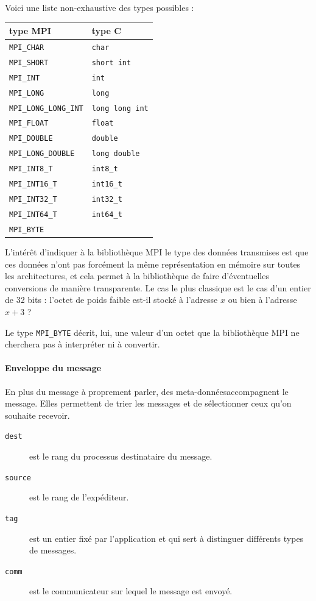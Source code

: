 Voici une liste non-exhaustive des types possibles :
\begin{center}
\begin{tabular}{|l|l|}
\hline
  type MPI & type C \\
\hline
\hline
\texttt{MPI\_CHAR} & \texttt{char} \\
\hline
\texttt{MPI\_SHORT} & \texttt{short int} \\
\hline
\texttt{MPI\_INT} & \texttt{int} \\
\hline
\texttt{MPI\_LONG} & \texttt{long} \\
\hline
\texttt{MPI\_LONG\_LONG\_INT} & \texttt{long long int} \\
\hline
\texttt{MPI\_FLOAT} & \texttt{float} \\
\hline
\texttt{MPI\_DOUBLE} & \texttt{double} \\
\hline
\texttt{MPI\_LONG\_DOUBLE} & \texttt{long double} \\
\hline
\texttt{MPI\_INT8\_T} & \texttt{int8\_t} \\
\hline
\texttt{MPI\_INT16\_T} & \texttt{int16\_t} \\
\hline
\texttt{MPI\_INT32\_T} & \texttt{int32\_t} \\
\hline
\texttt{MPI\_INT64\_T} & \texttt{int64\_t} \\
\hline
\texttt{MPI\_BYTE} & \\
\hline
\end{tabular}
\end{center}

L'intérêt d'indiquer à la bibliothèque MPI le type des données transmises
est que ces données n'ont pas forcément la même représentation en
mémoire sur toutes les architectures, et cela permet à la bibliothèque de
faire d'éventuelles conversions de manière transparente. Le cas le
plus classique est le cas d'un entier de 32 bits : l'octet de poids
faible est-il stocké à l'adresse $x$ ou bien à l'adresse $x+3$ ?

Le type \texttt{MPI\_BYTE} décrit, lui, une valeur d'un octet que la
bibliothèque MPI ne cherchera pas à interpréter ni à convertir.

\paragraph{Enveloppe du message} En plus du message à proprement
parler, des \og meta-données\fg accompagnent le message. Elles
permettent de trier les messages et de sélectionner ceux qu'on
souhaite recevoir.
\begin{description}
\item[\texttt{dest}] est le rang du processus destinataire du message.
\item[\texttt{source}] est le rang de l'expéditeur.
\item[\texttt{tag}] est un entier fixé par l'application et qui sert à
  distinguer différents types de messages.
\item[\texttt{comm}] est le communicateur sur lequel le message est envoyé.
\end{description}

